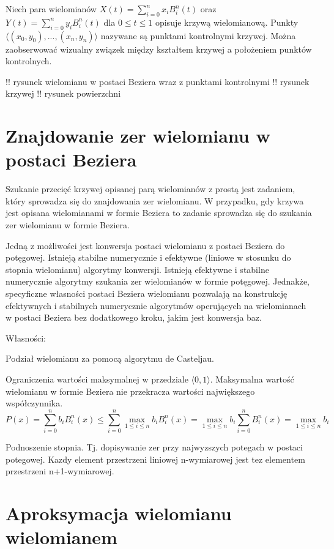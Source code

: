 \documentclass[11pt,a4paper,oneside]{report}
\begin{document}
Niech para wielomianów $X(t) = \sum^n_{i=0}x_i B^n_i(t)$ oraz $Y(t) = \sum^n_{i=0}y_i B^n_i(t)$ dla $0\leq t \leq 1$ opisuje krzywą wielomianową. Punkty $\langle (x_0,y_0), ..., (x_n, y_n) \rangle$ nazywane są punktami kontrolnymi krzywej. Można zaobserwować wizualny związek między kształtem krzywej a położeniem punktów kontrolnych.

!! rysunek wielomianu w postaci Beziera wraz z punktami kontrolnymi
!! rysunek krzywej
!! rysunek powierzchni

\section{Znajdowanie zer wielomianu w postaci Beziera}

Szukanie przecięć krzywej opisanej parą wielomianów z prostą jest zadaniem, który sprowadza się do znajdowania zer wielomianu. W przypadku, gdy krzywa jest opisana wielomianami w formie Beziera to zadanie sprowadza się do szukania zer wielomianu w formie Beziera.

Jedną z możliwości jest konwersja postaci wielomianu z postaci Beziera do potęgowej. Istnieją stabilne numerycznie i efektywne (liniowe w stosunku do stopnia wielomianu) algorytmy konwersji. Istnieją efektywne i stabilne numerycznie algorytmy szukania zer wielomianów w formie potęgowej. Jednakże, specyficzne własności postaci Beziera wielomianu pozwalają na konstrukcję efektywnych i stabilnych numerycznie algorytmów operujących na wielomianach w postaci Beziera bez dodatkowego kroku, jakim jest konwersja baz.

Własności:

Podział wielomianu za pomocą algorytmu de Casteljau.

Ograniczenia wartości maksymalnej w przedziale $\langle 0, 1 \rangle$. Maksymalna wartość wielomianu w formie Beziera nie przekracza wartości największego współczynnika.
$$ P(x) = \sum^n_{i=0} b_i B^n_i(x) \leq \sum^n_{i=0} \max_{1\leq i \leq n}{b_i} B^n_i(x) = \max_{1\leq i \leq n}{b_i} \sum^n_{i=0}B^n_i(x) = \max_{1\leq i \leq n}{b_i}$$

Podnoszenie stopnia.
Tj. dopisywanie zer przy najwyzszych potegach w postaci potegowej. Kazdy element przestrzeni liniowej n-wymiarowej jest tez elementem przestrzeni n+1-wymiarowej.

\section{Aproksymacja wielomianu wielomianem}
\end{document}
